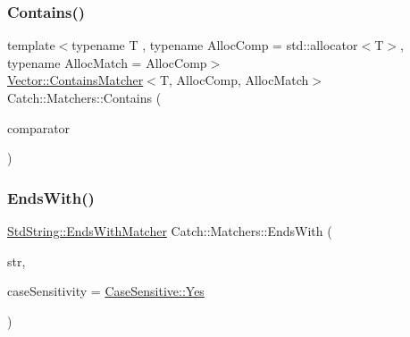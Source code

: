 \mbox{\label{namespace_catch_1_1_matchers_a6016aefc79a29573e7bd540c40a0f4dc}} 
\subsubsection{\texorpdfstring{Contains()}{Contains()}\hspace{0.1cm}{\footnotesize\ttfamily [2/2]}}
{\footnotesize\ttfamily template$<$typename T , typename Alloc\+Comp  = std\+::allocator$<$\+T$>$, typename Alloc\+Match  = Alloc\+Comp$>$ \\
\mbox{\hyperlink{struct_catch_1_1_matchers_1_1_vector_1_1_contains_matcher}{Vector\+::\+Contains\+Matcher}}$<$T, Alloc\+Comp, Alloc\+Match$>$ Catch\+::\+Matchers\+::\+Contains (\begin{DoxyParamCaption}\item[{std\+::vector$<$ T, Alloc\+Comp $>$ const \&}]{comparator }\end{DoxyParamCaption})}

\mbox{\label{namespace_catch_1_1_matchers_ae5a45efb4538c57c43e04f3f9043ad6e}} 
\subsubsection{\texorpdfstring{Ends\+With()}{EndsWith()}}
{\footnotesize\ttfamily \mbox{\hyperlink{struct_catch_1_1_matchers_1_1_std_string_1_1_ends_with_matcher}{Std\+String\+::\+Ends\+With\+Matcher}} Catch\+::\+Matchers\+::\+Ends\+With (\begin{DoxyParamCaption}\item[{std\+::string const \&}]{str,  }\item[{\mbox{\hyperlink{struct_catch_1_1_case_sensitive_aad49d3aee2d97066642fffa919685c6a}{Case\+Sensitive\+::\+Choice}}}]{case\+Sensitivity = {\ttfamily \mbox{\hyperlink{struct_catch_1_1_case_sensitive_aad49d3aee2d97066642fffa919685c6aa7c5550b69ec3c502e6f609b67f9613c6}{Case\+Sensitive\+::\+Yes}}} }\end{DoxyParamCaption})}

\mbox{\label{namespace_catch_1_1_matchers_af8af7dfc338335ed4c788cb1b37fc59f}} 

